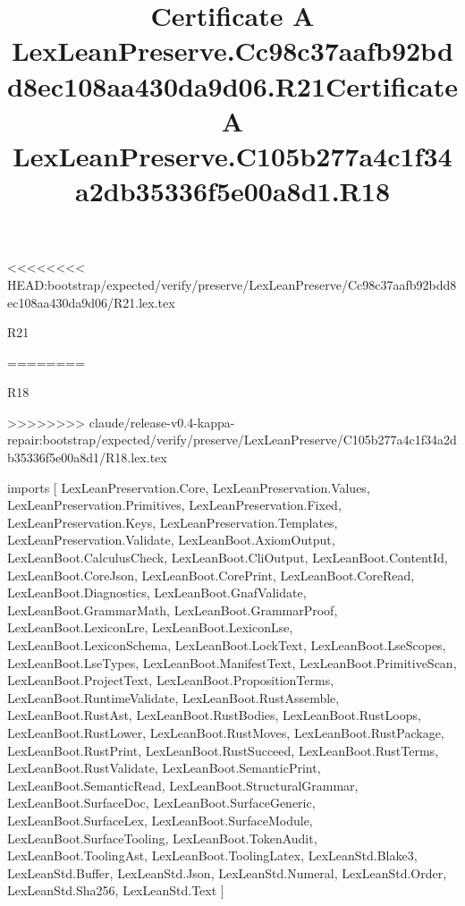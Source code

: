 <<<<<<<< HEAD:bootstrap/expected/verify/preserve/LexLeanPreserve/Cc98c37aafb92bdd8ec108aa430da9d06/R21.lex.tex
\begin{lexlean}{R21}
\title{Certificate A LexLeanPreserve.Cc98c37aafb92bdd8ec108aa430da9d06.R21}
========
\begin{lexlean}{R18}
\title{Certificate A LexLeanPreserve.C105b277a4c1f34a2db35336f5e00a8d1.R18}
>>>>>>>> claude/release-v0.4-kappa-repair:bootstrap/expected/verify/preserve/LexLeanPreserve/C105b277a4c1f34a2db35336f5e00a8d1/R18.lex.tex
\begin{coremodule}
imports [
  LexLeanPreservation.Core,
  LexLeanPreservation.Values,
  LexLeanPreservation.Primitives,
  LexLeanPreservation.Fixed,
  LexLeanPreservation.Keys,
  LexLeanPreservation.Templates,
  LexLeanPreservation.Validate,
  LexLeanBoot.AxiomOutput,
  LexLeanBoot.CalculusCheck,
  LexLeanBoot.CliOutput,
  LexLeanBoot.ContentId,
  LexLeanBoot.CoreJson,
  LexLeanBoot.CorePrint,
  LexLeanBoot.CoreRead,
  LexLeanBoot.Diagnostics,
  LexLeanBoot.GnafValidate,
  LexLeanBoot.GrammarMath,
  LexLeanBoot.GrammarProof,
  LexLeanBoot.LexiconLre,
  LexLeanBoot.LexiconLse,
  LexLeanBoot.LexiconSchema,
  LexLeanBoot.LockText,
  LexLeanBoot.LseScopes,
  LexLeanBoot.LseTypes,
  LexLeanBoot.ManifestText,
  LexLeanBoot.PrimitiveScan,
  LexLeanBoot.ProjectText,
  LexLeanBoot.PropositionTerms,
  LexLeanBoot.RuntimeValidate,
  LexLeanBoot.RustAssemble,
  LexLeanBoot.RustAst,
  LexLeanBoot.RustBodies,
  LexLeanBoot.RustLoops,
  LexLeanBoot.RustLower,
  LexLeanBoot.RustMoves,
  LexLeanBoot.RustPackage,
  LexLeanBoot.RustPrint,
  LexLeanBoot.RustSucceed,
  LexLeanBoot.RustTerms,
  LexLeanBoot.RustValidate,
  LexLeanBoot.SemanticPrint,
  LexLeanBoot.SemanticRead,
  LexLeanBoot.StructuralGrammar,
  LexLeanBoot.SurfaceDoc,
  LexLeanBoot.SurfaceGeneric,
  LexLeanBoot.SurfaceLex,
  LexLeanBoot.SurfaceModule,
  LexLeanBoot.SurfaceTooling,
  LexLeanBoot.TokenAudit,
  LexLeanBoot.ToolingAst,
  LexLeanBoot.ToolingLatex,
  LexLeanStd.Blake3,
  LexLeanStd.Buffer,
  LexLeanStd.Json,
  LexLeanStd.Numeral,
  LexLeanStd.Order,
  LexLeanStd.Sha256,
  LexLeanStd.Text
]


\end{coremodule}
\end{lexlean}
\end{lexlean}
